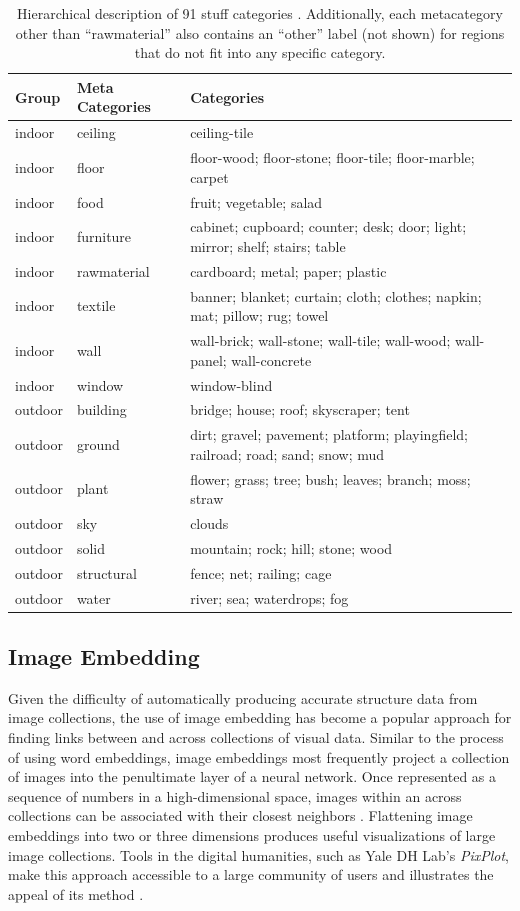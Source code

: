 \documentclass[10pt, a4paper]{article}
\begin{document}
\begin{table}[ht!]
\centering
\begin{tabular}{lll}
 \hline
\textbf{Group} & \textbf{Meta Categories} & \textbf{Categories} \\
 \hline
 indoor & ceiling & ceiling-tile \\
 indoor & floor & floor-wood; floor-stone; floor-tile; floor-marble; carpet \\
 indoor & food & fruit; vegetable; salad \\
 indoor & furniture & cabinet; cupboard; counter; desk; door; light; mirror; shelf; stairs; table \\
 indoor & rawmaterial & cardboard; metal; paper; plastic \\
 indoor & textile & banner; blanket; curtain; cloth; clothes; napkin; mat; pillow; rug; towel \\
 indoor & wall & wall-brick; wall-stone; wall-tile; wall-wood; wall-panel; wall-concrete \\
 indoor & window & window-blind \\ \hline
 outdoor & building & bridge; house; roof; skyscraper; tent \\
 outdoor & ground & dirt; gravel; pavement; platform; playingfield; railroad; road; sand; snow; mud \\
 outdoor & plant & flower; grass; tree; bush; leaves; branch; moss; straw \\
 outdoor & sky & clouds \\
 outdoor & solid & mountain; rock; hill; stone; wood \\
 outdoor & structural & fence; net; railing; cage \\
 outdoor & water & river; sea; waterdrops; fog \\
  \hline
\end{tabular}
\caption{Hierarchical description of 91 stuff categories \protect\cite{caesar2018coco}.
Additionally, each metacategory other than ``rawmaterial'' also contains an
``other'' label (not shown) for regions that do not fit into any specific
category.}
\label{tab:categories}
\end{table}

\subsection{Image Embedding}

Given the difficulty of automatically producing accurate structure data from
image collections, the use of image embedding has become a popular approach
for finding links between and across collections of visual data. Similar to
the process of using word embeddings, image embeddings most frequently project
a collection of images into the penultimate layer of a neural
network. Once represented as a sequence of numbers in a high-dimensional space,
images within an across collections can be associated with their closest
neighbors \cite{mcauley2015image}. Flattening image embeddings into two or three dimensions
produces useful visualizations of large image collections. Tools in the digital
humanities, such as Yale DH Lab's \textit{PixPlot}, make this approach
accessible to a large community of users and illustrates the appeal of its
method \cite{pixplot}.
\end{document}
